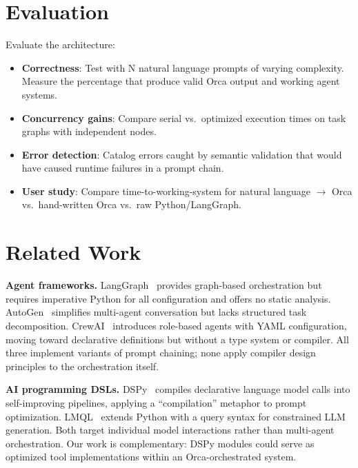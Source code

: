\documentclass[sigconf,nonacm]{acmart}
\begin{document}
\section{Evaluation}
\label{sec:evaluation}

\begin{todobox}
Evaluate the architecture:
\begin{itemize}
  \item \textbf{Correctness}: Test with N natural language prompts of
        varying complexity. Measure the percentage that produce valid
        Orca output and working agent systems.
  \item \textbf{Concurrency gains}: Compare serial vs.\ optimized
        execution times on task graphs with independent nodes.
  \item \textbf{Error detection}: Catalog errors caught by semantic
        validation that would have caused runtime failures in a prompt
        chain.
  \item \textbf{User study}: Compare time-to-working-system for
        natural language $\rightarrow$ Orca vs.\ hand-written Orca vs.\
        raw Python/LangGraph.
\end{itemize}
\end{todobox}

\section{Related Work}
\label{sec:related}

\noindent\textbf{Agent frameworks.}
LangGraph~\cite{langgraph} provides graph-based orchestration but
requires imperative Python for all configuration and offers no static
analysis. AutoGen~\cite{autogen} simplifies multi-agent conversation
but lacks structured task decomposition. CrewAI~\cite{crewai}
introduces role-based agents with YAML configuration, moving toward
declarative definitions but without a type system or compiler. All three
implement variants of prompt chaining; none apply compiler design
principles to the orchestration itself.

\noindent\textbf{AI programming DSLs.}
DSPy~\cite{dspy} compiles declarative language model calls into
self-improving pipelines, applying a ``compilation'' metaphor to prompt
optimization. LMQL~\cite{lmql} extends Python with a query syntax for
constrained LLM generation. Both target individual model interactions
rather than multi-agent orchestration. Our work is complementary: DSPy
modules could serve as optimized tool implementations within an
Orca-orchestrated system.
\end{document}
